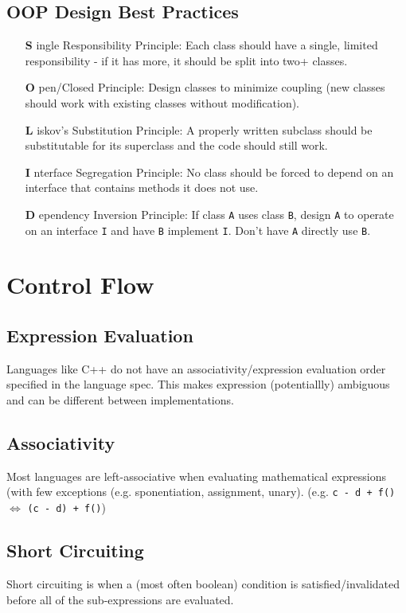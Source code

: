 \documentclass{article}
\begin{document}
\subsection{OOP Design Best Practices}
\begin{itemize}[align=right]
\item [\textbf{S}]ingle Responsibility Principle: Each class should
  have a single, limited responsibility - if it has more, it should be
  split into two+ classes.
\item [\textbf{O}]pen/Closed Principle: Design classes to minimize
  coupling (new classes should work with existing classes without modification).
\item [\textbf{L}]iskov's Substitution Principle: A properly written
  subclass should be substitutable for its superclass and the code
  should still work.
\item [\textbf{I}]nterface Segregation Principle: No class should be
  forced to depend on an interface that contains methods it does not use.
\item [\textbf{D}]ependency Inversion Principle: If class \texttt{A}
  uses class \texttt{B}, design \texttt{A} to operate on an interface \texttt{I}
  and have \texttt{B} implement \texttt{I}. Don't have \texttt{A}
  directly use \texttt{B}.
\end{itemize}




\section{Control Flow}

\subsection{Expression Evaluation}
Languages like C++ do not have an associativity/expression evaluation
order specified in the language spec. This makes expression
(potentiallly) ambiguous and can be different between
implementations.

\subsection{Associativity}
Most languages are left-associative when evaluating mathematical
expressions (with few exceptions (e.g. sponentiation, assignment,
unary). (e.g. \texttt{c - d + f()} $\iff$ \texttt{(c - d) + f()})

\subsection{Short Circuiting}
Short circuiting is when a (most often boolean) condition is
satisfied/invalidated before all of the sub-expressions are
evaluated.
\end{document}
